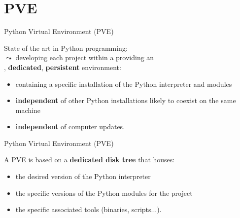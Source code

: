 \documentclass[11pt, serif, mathserif, compress]{beamer}  %
\begin{document}
\section{PVE}

\begin{frame}{Python Virtual Environment (PVE)}
  \vspace*{-3mm}
  \begin{tcolorbox}[title=Interest of a PVE, add to width=7mm]
    State of the art in Python programming:\\
    $\leadsto$ developing each project within a  providing an\\
    \phantom{$\leadsto$ }{\bf isolated}, {\bf dedicated}, {\bf persistent} environment:
    \medskip
    \begin{itemize}\setlength\itemsep{5mm}
    \item<2-> containing a specific installation of the Python interpreter and modules  
    \item<3-> {\bf independent} of other Python installations likely to coexist on the same machine
    \item<4-> {\bf independent} of computer updates. 
    \end{itemize}
  \end{tcolorbox}
    
\end{frame}

\begin{frame}{Python Virtual Environment (PVE)}
  \vspace*{-3mm}
  \begin{tcolorbox}[title=A simple implementation..., add to width=7mm]
    A PVE is based on a {\bf dedicated disk tree} that houses:
    \medskip
    \begin{itemize}\setlength\itemsep{4mm}
    \item<2-> the desired version of the Python interpreter 
    \item<3-> the specific versions of the Python modules for the project
    \item<4-> the specific associated tools (binaries, scripts...).
    \end{itemize}
  \end{tcolorbox}

  
\end{frame}
\end{document}
